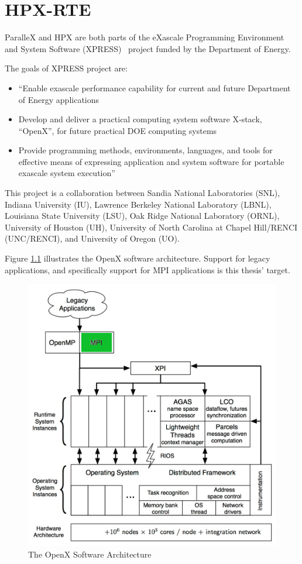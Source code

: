 \chapter{HPX-RTE}
\label{sec:HPX-RTE}

ParalleX and HPX are both parts of the eXascale Programming Environment and System Software (XPRESS)~\cite{huck2013early,brightwell2013xpress} project funded by the Department of Energy.

The goals of XPRESS project are:
\begin{itemize}
\item ``Enable exascale performance capability for current and future Department of Energy applications
\item Develop and deliver a practical computing system software X‐stack, ``OpenX'', for future practical DOE computing systems
\item Provide programming methods, environments, languages, and tools for effective means of expressing application and system software for portable exascale system execution''~\cite{xpress}
\end{itemize}

This project is a collaboration between Sandia National Laboratories (SNL), Indiana University (IU), Lawrence Berkeley National Laboratory (LBNL), Louisiana State University (LSU), Oak Ridge National Laboratory (ORNL), University of Houston (UH), University of North Carolina at Chapel Hill/RENCI (UNC/RENCI), and University of Oregon (UO).

Figure \ref{fig:openx} illustrates the OpenX software architecture. Support for legacy applications, and specifically support for MPI applications is this thesis' target.

\begin{figure}[h!]
\centering
\includegraphics[scale=0.75]{images/openx.png}
\caption[The OpenX Software Architecture]{The OpenX Software Architecture}
\label{fig:openx}
\end{figure}


